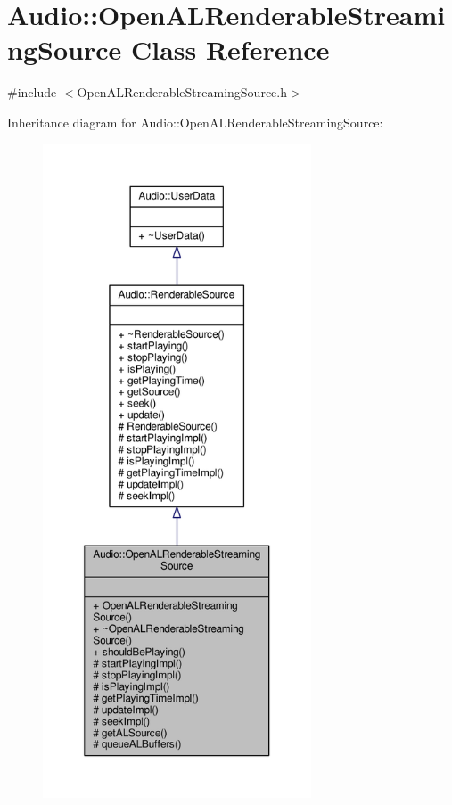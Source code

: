 \hypertarget{classAudio_1_1OpenALRenderableStreamingSource}{}\section{Audio\+:\+:Open\+A\+L\+Renderable\+Streaming\+Source Class Reference}
\label{classAudio_1_1OpenALRenderableStreamingSource}


{\ttfamily \#include $<$Open\+A\+L\+Renderable\+Streaming\+Source.\+h$>$}



Inheritance diagram for Audio\+:\+:Open\+A\+L\+Renderable\+Streaming\+Source\+:
\nopagebreak
\begin{figure}[H]
\begin{center}
\leavevmode
\includegraphics[height=550pt]{d5/d5a/classAudio_1_1OpenALRenderableStreamingSource__inherit__graph}
\end{center}
\end{figure}



